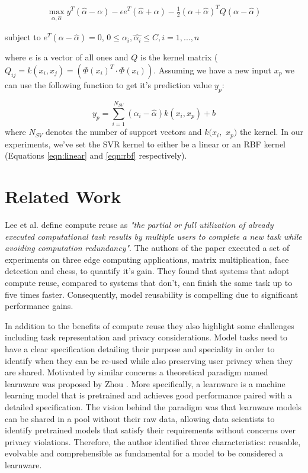 \documentclass{mpaper}
\begin{document}
\begin{equation}
\begin{aligned}
    \max_{\alpha,\hat{\alpha}}{y^T (\hat{\alpha} -\alpha) - \epsilon e^T(\hat{\alpha} +\alpha)  - \frac{1}{2}{(\alpha+\hat{\alpha})^TQ(\alpha-\hat{\alpha})}}
\end{aligned}
\end{equation}
\begin{center}
    subject to $e^T(\alpha-\hat{\alpha})=0$, $0 \leq \alpha_i,\hat{\alpha_i} \leq C, i=1,...,n$
\end{center}
where $e$ is a vector of all ones and $Q$ is the kernel matrix ($Q_{ij}=k(x_i,x_j) = (\Phi(x_i)^T \cdot \Phi(x_i))$. Assuming we have a new input $x_p$ we can use the following function to get it's prediction value $y_p$:

\begin{equation}
    y_p = \sum_{i=1}^{N_{SV}}(\alpha_i-\hat{\alpha})k(x_i,x_p) + b
\end{equation}
where $N_{SV}$ denotes the number of support vectors and $k(x_i,$ $x_p)$ the kernel. In our experiments, we've set the SVR kernel to either be a linear or an RBF kernel (Equations \ref{eqn:linear} and \ref{eqn:rbf} respectively).

\section{Related Work}

Lee et al. \cite{ComputeReuse} define compute reuse as \textit{"the partial or full utilization of already executed computational task results by multiple users to complete a new task while avoiding computation redundancy"}. The authors of the paper executed a set of experiments on three edge computing applications, matrix multiplication, face detection and chess, to quantify it's gain. They found that systems that adopt compute reuse, compared to systems that don't, can finish the same task up to five times faster. Consequently, model reusability is compelling due to significant performance gains.

In addition to the benefits of compute reuse they also highlight some challenges including task representation and privacy considerations. Model tasks need to have a clear specification detailing their purpose and speciality in order to identify when they can be re-used while also preserving user privacy when they are shared. Motivated by similar concerns a theoretical paradigm named learnware was proposed by Zhou \cite{Learnware}. More specifically, a learnware is a machine learning model that is pretrained and achieves good performance paired with a detailed specification. The vision behind the paradigm was that learnware models can be shared in a pool without their raw data, allowing data scientists to identify pretrained models that satisfy their requirements without concerns over privacy violations. Therefore, the author identified three characteristics: reusable, evolvable and comprehensible as fundamental for a model to be considered a learnware.  
\end{document}
